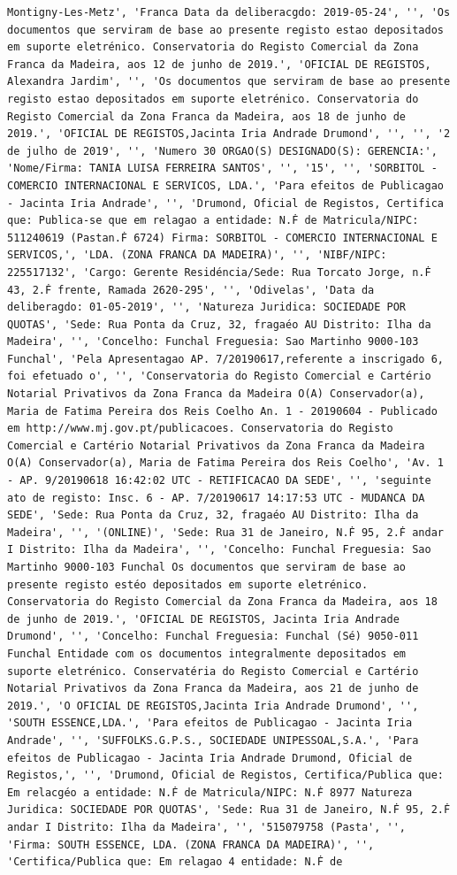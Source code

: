 \documentclass[
  12pt,
]{article}
\begin{document}
\begin{verbatim}
Montigny-Les-Metz', 'Franca Data da deliberacgdo: 2019-05-24', '', 'Os documentos que serviram de base ao presente registo estao depositados em suporte eletrénico. Conservatoria do Registo Comercial da Zona Franca da Madeira, aos 12 de junho de 2019.', 'OFICIAL DE REGISTOS, Alexandra Jardim', '', 'Os documentos que serviram de base ao presente registo estao depositados em suporte eletrénico. Conservatoria do Registo Comercial da Zona Franca da Madeira, aos 18 de junho de 2019.', 'OFICIAL DE REGISTOS,Jacinta Iria Andrade Drumond', '', '', '2 de julho de 2019', '', 'Numero 30 ORGAO(S) DESIGNADO(S): GERENCIA:', 'Nome/Firma: TANIA LUISA FERREIRA SANTOS', '', '15', '', 'SORBITOL - COMERCIO INTERNACIONAL E SERVICOS, LDA.', 'Para efeitos de Publicagao - Jacinta Iria Andrade', '', 'Drumond, Oficial de Registos, Certifica que: Publica-se que em relagao a entidade: N.Ḟ de Matricula/NIPC: 511240619 (Pastan.Ḟ 6724) Firma: SORBITOL - COMERCIO INTERNACIONAL E SERVICOS,', 'LDA. (ZONA FRANCA DA MADEIRA)', '', 'NIBF/NIPC: 225517132', 'Cargo: Gerente Residéncia/Sede: Rua Torcato Jorge, n.Ḟ 43, 2.Ḟ frente, Ramada 2620-295', '', 'Odivelas', 'Data da deliberagdo: 01-05-2019', '', 'Natureza Juridica: SOCIEDADE POR QUOTAS', 'Sede: Rua Ponta da Cruz, 32, fragaéo AU Distrito: Ilha da Madeira', '', 'Concelho: Funchal Freguesia: Sao Martinho 9000-103 Funchal', 'Pela Apresentagao AP. 7/20190617,referente a inscrigado 6, foi efetuado o', '', 'Conservatoria do Registo Comercial e Cartério Notarial Privativos da Zona Franca da Madeira O(A) Conservador(a), Maria de Fatima Pereira dos Reis Coelho An. 1 - 20190604 - Publicado em http://www.mj.gov.pt/publicacoes. Conservatoria do Registo Comercial e Cartério Notarial Privativos da Zona Franca da Madeira O(A) Conservador(a), Maria de Fatima Pereira dos Reis Coelho', 'Av. 1 - AP. 9/20190618 16:42:02 UTC - RETIFICACAO DA SEDE', '', 'seguinte ato de registo: Insc. 6 - AP. 7/20190617 14:17:53 UTC - MUDANCA DA SEDE', 'Sede: Rua Ponta da Cruz, 32, fragaéo AU Distrito: Ilha da Madeira', '', '(ONLINE)', 'Sede: Rua 31 de Janeiro, N.Ḟ 95, 2.Ḟ andar I Distrito: Ilha da Madeira', '', 'Concelho: Funchal Freguesia: Sao Martinho 9000-103 Funchal Os documentos que serviram de base ao presente registo estéo depositados em suporte eletrénico. Conservatoria do Registo Comercial da Zona Franca da Madeira, aos 18 de junho de 2019.', 'OFICIAL DE REGISTOS, Jacinta Iria Andrade Drumond', '', 'Concelho: Funchal Freguesia: Funchal (Sé) 9050-011 Funchal Entidade com os documentos integralmente depositados em suporte eletrénico. Conservatéria do Registo Comercial e Cartério Notarial Privativos da Zona Franca da Madeira, aos 21 de junho de 2019.', 'O OFICIAL DE REGISTOS,Jacinta Iria Andrade Drumond', '', 'SOUTH ESSENCE,LDA.', 'Para efeitos de Publicagao - Jacinta Iria Andrade', '', 'SUFFOLKS.G.P.S., SOCIEDADE UNIPESSOAL,S.A.', 'Para efeitos de Publicagao - Jacinta Iria Andrade Drumond, Oficial de Registos,', '', 'Drumond, Oficial de Registos, Certifica/Publica que: Em relacgéo a entidade: N.Ḟ de Matricula/NIPC: N.Ḟ 8977 Natureza Juridica: SOCIEDADE POR QUOTAS', 'Sede: Rua 31 de Janeiro, N.Ḟ 95, 2.Ḟ andar I Distrito: Ilha da Madeira', '', '515079758 (Pasta', '', 'Firma: SOUTH ESSENCE, LDA. (ZONA FRANCA DA MADEIRA)', '', 'Certifica/Publica que: Em relagao 4 entidade: N.Ḟ de 
\end{verbatim}
\end{document}
